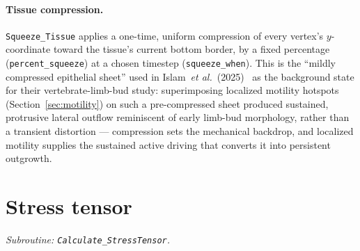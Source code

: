 \documentclass[11pt]{article}
\begin{document}
\paragraph{Tissue compression.} \texttt{Squeeze\_\allowbreak Tissue} applies a
one-time, uniform compression of every vertex's $y$-coordinate toward the tissue's
current bottom border, by a fixed percentage (\texttt{percent\_\allowbreak squeeze}) at
a chosen timestep (\texttt{squeeze\_\allowbreak when}). This is the ``mildly
compressed epithelial sheet'' used in Islam~\emph{et al.}~(2025)~\cite{islam2025} as
the background state for their vertebrate-limb-bud study: superimposing localized
motility hotspots (Section~\ref{sec:motility}) on such a pre-compressed sheet produced
sustained, protrusive lateral outflow reminiscent of early limb-bud morphology, rather
than a transient distortion --- compression sets the mechanical backdrop, and
localized motility supplies the sustained active driving that converts it into
persistent outgrowth.

\section{Stress tensor}
\label{sec:stress}

\textit{Subroutine: \texttt{Calculate\_StressTensor}.}
\end{document}
